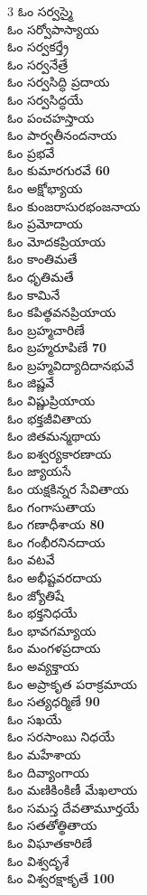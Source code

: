\documentclass[a4paper]{article}
\newcommand{\nm}[1]{\hfill{\color{saffron}\bfseries\footnotesize #1}}
\begin{document}
\begin{multicols}{3}
ఓం సర్వస్మై\\ ఓం సర్వోపాస్యాయ\\ ఓం సర్వకర్త్రే\\ ఓం సర్వనేత్రే\\ ఓం సర్వసిద్ధి ప్రదాయ\\ ఓం సర్వసిద్ధయే\\ ఓం పంచహస్తాయ\\ ఓం పార్వతీనందనాయ\\ ఓం ప్రభవే\\ ఓం కుమారగురవే \nm{60}\\
ఓం అక్షోభ్యాయ\\ ఓం కుంజరాసురభంజనాయ\\ ఓం ప్రమోదాయ\\ ఓం మోదకప్రియాయ\\ ఓం కాంతిమతే\\ ఓం ధృతిమతే\\ ఓం కామినే\\ ఓం కపిత్థవనప్రియాయ\\ ఓం బ్రహ్మచారిణే\\ ఓం బ్రహ్మరూపిణే \nm{70}\\
ఓం బ్రహ్మవిద్యాదిదానభువే\\ ఓం జిష్ణవే\\ ఓం విష్ణుప్రియాయ\\ ఓం భక్తజీవితాయ\\ ఓం జితమన్మథాయ\\ ఓం ఐశ్వర్యకారణాయ\\ ఓం జ్యాయసే\\ ఓం యక్షకిన్నర సేవితాయ\\ ఓం గంగాసుతాయ\\ ఓం గణాధీశాయ \nm{80}\\
ఓం గంభీరనినదాయ\\ ఓం వటవే\\ ఓం అభీష్టవరదాయ\\ ఓం జ్యోతిషే\\ ఓం భక్తనిధయే\\ ఓం భావగమ్యాయ\\ ఓం మంగళప్రదాయ\\ ఓం అవ్యక్తాయ\\ ఓం అప్రాకృత పరాక్రమాయ\\ ఓం సత్యధర్మిణే \nm{90}\\
ఓం సఖయే\\ ఓం సరసాంబు నిధయే\\ ఓం మహేశాయ\\ ఓం దివ్యాంగాయ\\ ఓం మణికింకిణీ మేఖలాయ\\ ఓం సమస్త దేవతామూర్తయే\\ ఓం సతతోత్థితాయ\\ ఓం విఘాతకారిణే\\ ఓం విశ్వదృశే\\ ఓం విశ్వరక్షాకృతే \nm{100}\\

\end{multicols}
\end{document}
